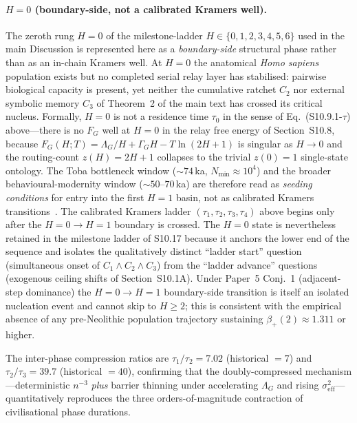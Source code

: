\documentclass[11pt]{article}
\begin{document}
\paragraph{$H{=}0$ (boundary-side, not a calibrated Kramers well).}
The zeroth rung $H{=}0$ of the milestone-ladder $H\in\{0,1,2,3,4,5,6\}$ used in the main Discussion is represented here as a \emph{boundary-side} structural phase rather than as an in-chain Kramers well.  At $H{=}0$ the anatomical \emph{Homo sapiens} population exists but no completed serial relay layer has stabilised: pairwise biological capacity is present, yet neither the cumulative ratchet $C_2$ nor external symbolic memory $C_3$ of Theorem~2 of the main text has crossed its critical nucleus.  Formally, $H{=}0$ is not a residence time $\tau_0$ in the sense of Eq.~(S10.9.1-$\tau$) above—there is no $F_G$ well at $H{=}0$ in the relay free energy of Section~S10.8, because $F_G(H;T)=\Lambda_G/H+\Gamma_G H-T\ln(2H{+}1)$ is singular as $H\to 0$ and the routing-count $z(H)=2H{+}1$ collapses to the trivial $z(0)=1$ single-state ontology.  The Toba bottleneck window ($\sim 74$\,ka, $N_{\min}\approx 10^{4}$) and the broader behavioural-modernity window ($\sim 50$--$70$\,ka) are therefore read as \emph{seeding conditions} for entry into the first $H{=}1$ basin, not as calibrated Kramers transitions~\cite{ambrose1998}.  The calibrated Kramers ladder $(\tau_1,\tau_2,\tau_3,\tau_4)$ above begins only after the $H{=}0\to H{=}1$ boundary is crossed.  The $H{=}0$ state is nevertheless retained in the milestone ladder of S10.17 because it anchors the lower end of the sequence and isolates the qualitatively distinct ``ladder start'' question (simultaneous onset of $C_1{\wedge}C_2{\wedge}C_3$) from the ``ladder advance'' questions (exogenous ceiling shifts of Section~S10.1A).  Under Paper~5 Conj.~1 (adjacent-step dominance) the $H{=}0\to H{=}1$ boundary-side transition is itself an isolated nucleation event and cannot skip to $H{\ge}2$; this is consistent with the empirical absence of any pre-Neolithic population trajectory sustaining $\beta_{+}(2)\approx 1.311$ or higher.

\noindent
The inter-phase compression ratios are
$\tau_1/\tau_2 = 7.02$ (historical $= 7$) and
$\tau_2/\tau_3 = 39.7$ (historical $= 40$), confirming that the
doubly-compressed mechanism---deterministic $n^{-3}$ \emph{plus}
barrier thinning under accelerating $\Lambda_G$ and rising
$\sigma_{\mathrm{eff}}^2$---quantitatively reproduces the three
orders-of-magnitude contraction of civilisational phase durations.
\end{document}
